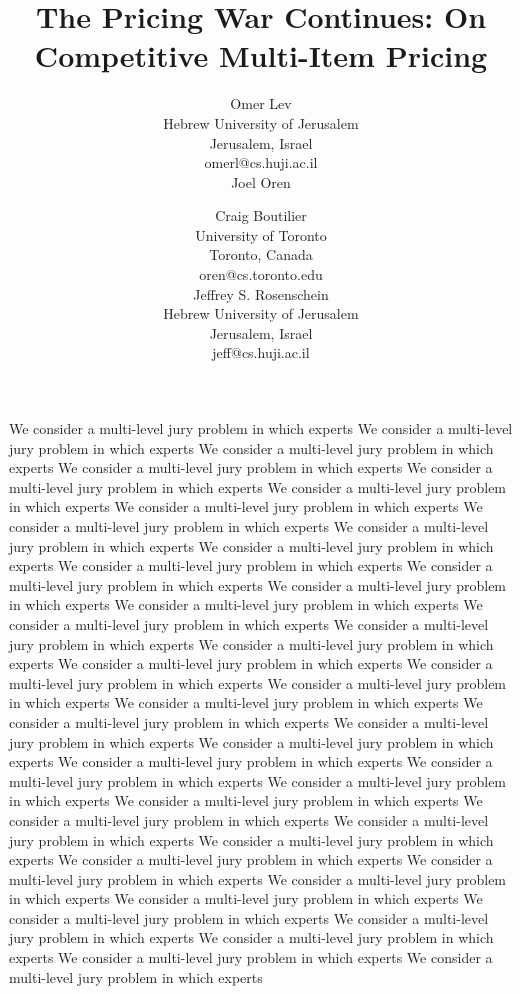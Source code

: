 \documentclass[letterpaper]{article}
\title{The Pricing War Continues: On Competitive Multi-Item Pricing}
\author{Omer Lev\\
Hebrew University of Jerusalem\\
Jerusalem, Israel\\
omerl@cs.huji.ac.il\\
\And
Joel Oren \and Craig Boutilier\\
University of Toronto\\
Toronto, Canada\\
oren@cs.toronto.edu\\
\And
Jeffrey S. Rosenschein\\
Hebrew University of Jerusalem\\
Jerusalem, Israel\\
jeff@cs.huji.ac.il\\}
\begin{document}
\maketitle




% 





%

We consider a multi-level jury problem in which experts
We consider a multi-level jury problem in which experts
We consider a multi-level jury problem in which experts
We consider a multi-level jury problem in which experts
We consider a multi-level jury problem in which experts
We consider a multi-level jury problem in which experts
We consider a multi-level jury problem in which experts
We consider a multi-level jury problem in which experts
We consider a multi-level jury problem in which experts
We consider a multi-level jury problem in which experts
We consider a multi-level jury problem in which experts
We consider a multi-level jury problem in which experts
We consider a multi-level jury problem in which experts
We consider a multi-level jury problem in which experts
We consider a multi-level jury problem in which experts
We consider a multi-level jury problem in which experts
We consider a multi-level jury problem in which experts
We consider a multi-level jury problem in which experts
We consider a multi-level jury problem in which experts
We consider a multi-level jury problem in which experts
We consider a multi-level jury problem in which experts
We consider a multi-level jury problem in which experts
We consider a multi-level jury problem in which experts
We consider a multi-level jury problem in which experts
We consider a multi-level jury problem in which experts
We consider a multi-level jury problem in which experts
We consider a multi-level jury problem in which experts
We consider a multi-level jury problem in which experts
We consider a multi-level jury problem in which experts
We consider a multi-level jury problem in which experts
We consider a multi-level jury problem in which experts
We consider a multi-level jury problem in which experts
We consider a multi-level jury problem in which experts
We consider a multi-level jury problem in which experts
We consider a multi-level jury problem in which experts
We consider a multi-level jury problem in which experts
We consider a multi-level jury problem in which experts
We consider a multi-level jury problem in which experts
We consider a multi-level jury problem in which experts
We consider a multi-level jury problem in which experts
\clearpage

\end{document}
